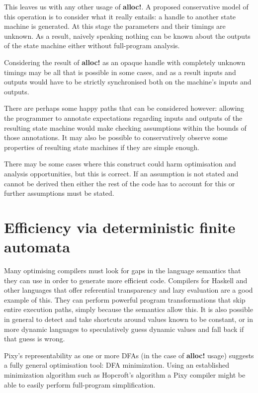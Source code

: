 \documentclass{scrartcl}
\begin{document}
    This leaves us with any other usage of \textbf{alloc!}. A proposed conservative model of this operation is to consider what it really entails: a handle to another state machine is generated. At this stage the parameters and their timings are unknown. As a result, naively speaking nothing can be known about the outputs of the state machine either without full-program analysis.
    
    Considering the result of \textbf{alloc!} as an opaque handle with completely unknown timings may be all that is possible in some cases, and as a result inputs and outputs would have to be strictly synchronised both on the machine's inputs and outputs.
    
    There are perhaps some happy paths that can be considered however: allowing the programmer to annotate expectations regarding inputs and outputs of the resulting state machine would make checking assumptions within the bounds of those annotations. It may also be possible to conservatively observe some properties of resulting state machines if they are simple enough.
    
    There may be some cases where this construct could harm optimisation and analysis opportunities, but this is correct. If an assumption is not stated and cannot be derived then either the rest of the code has to account for this or further assumptions must be stated.

    \section{Efficiency via deterministic finite automata}
    
    \label{sec:efficiency}
    
    Many optimising compilers must look for gaps in the language semantics that they can use in order to generate more efficient code. Compilers for Haskell and other languages that offer referential transparency and lazy evaluation are a good example of this. They can perform powerful program transformations that skip entire execution paths, simply because the semantics allow this. It is also possible in general to detect and take shortcuts around values known to be constant, or in more dynamic languages to speculatively guess dynamic values and fall back if that guess is wrong.
    
    Pixy's representability as one or more DFAs (in the case of \textbf{alloc!} usage) suggests a fully general optimisation tool: DFA minimization. Using an established minimization algorithm such as Hopcroft's algorithm a Pixy compiler might be able to easily perform  full-program simplification.
    
\end{document}
